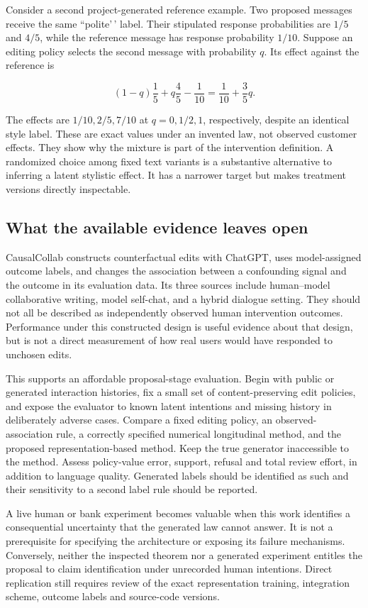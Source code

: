 Consider a second project-generated reference example. Two proposed
messages receive the same ``polite'\,' label. Their stipulated response
probabilities are \(1/5\) and \(4/5\), while the reference message has
response probability \(1/10\). Suppose an editing policy selects the
second message with probability \(q\). Its effect against the reference
is

\[
 (1-q)\frac15+q\frac45-\frac1{10}
 =\frac1{10}+\frac35q.
\]

The effects are \(1/10,2/5,7/10\) at \(q=0,1/2,1\), respectively,
despite an identical style label. These are exact values under an
invented law, not observed customer effects. They show why the mixture
is part of the intervention definition. A randomized choice among fixed
text variants is a substantive alternative to inferring a latent
stylistic effect. It has a narrower target but makes treatment versions
directly inspectable.

\hypertarget{what-the-available-evidence-leaves-open}{%
\subsection{What the available evidence leaves
open}\label{what-the-available-evidence-leaves-open}}

CausalCollab constructs counterfactual edits with ChatGPT, uses
model-assigned outcome labels, and changes the association between a
confounding signal and the outcome in its evaluation data. Its three
sources include human--model collaborative writing, model self-chat, and
a hybrid dialogue setting. They should not all be described as
independently observed human intervention outcomes. Performance under
this constructed design is useful evidence about that design, but is not
a direct measurement of how real users would have responded to unchosen
edits. \cite{exec13_census_collaboration}

This supports an affordable proposal-stage evaluation. Begin with public
or generated interaction histories, fix a small set of
content-preserving edit policies, and expose the evaluator to known
latent intentions and missing history in deliberately adverse cases.
Compare a fixed editing policy, an observed-association rule, a
correctly specified numerical longitudinal method, and the proposed
representation-based method. Keep the true generator inaccessible to the
method. Assess policy-value error, support, refusal and total review
effort, in addition to language quality. Generated labels should be
identified as such and their sensitivity to a second label rule should
be reported.

A live human or bank experiment becomes valuable when this work
identifies a consequential uncertainty that the generated law cannot
answer. It is not a prerequisite for specifying the architecture or
exposing its failure mechanisms. Conversely, neither the inspected
theorem nor a generated experiment entitles the proposal to claim
identification under unrecorded human intentions. Direct replication
still requires review of the exact representation training, integration
scheme, outcome labels and source-code versions.

\label{exec13:census-temporal-end}
